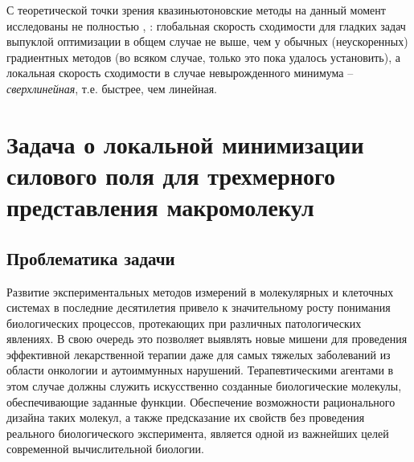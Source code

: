   С теоретической точки зрения квазиньютоновские методы на данный момент исследованы не полностью \cite{nesterov2013introductory}, \cite{nocedal2006sequential}: глобальная скорость сходимости для гладких задач выпуклой оптимизации в общем случае не выше, чем у обычных (неускоренных) градиентных методов (во всяком случае, только это пока удалось установить), а локальная скорость сходимости в случае невырожденного минимума -- \textit{сверхлинейная}, т.е. быстрее, чем линейная. 


\section{Задача о локальной минимизации силового поля для трехмерного представления макромолекул} \label{sec:ch1/sec2}

\subsection{Проблематика задачи} \label{subsec:sec1/su1}
  Развитие экспериментальных методов измерений в молекулярных и клеточных системах в последние десятилетия привело к значительному росту понимания биологических процессов, протекающих при различных патологических явлениях.
  В свою очередь это позволяет выявлять новые мишени для проведения эффективной лекарственной терапии даже для самых тяжелых заболеваний из области онкологии и аутоиммунных нарушений.
  Терапевтическими агентами в этом случае должны служить искусственно созданные биологические молекулы, обеспечивающие заданные функции.
  Обеспечение возможности рационального дизайна таких молекул, а также предсказание их свойств без проведения реального биологического эксперимента, является одной из важнейших целей современной вычислительной биологии.

